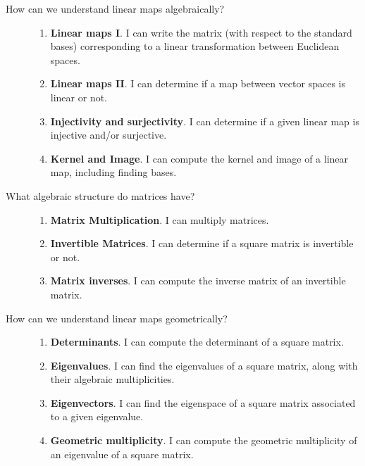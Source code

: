 \documentclass{article}
\begin{document}
\begin{description}
\item[How can we understand linear maps algebraically?] \hfill
\begin{enumerate}
\item {\bf Linear maps I}.  I can write the matrix (with respect to the standard bases) corresponding to a linear transformation between Euclidean spaces.
\item {\bf Linear maps II}. I can determine if a map between vector spaces is linear or not.
\item {\bf Injectivity and surjectivity}.  I can determine if a given linear map is injective and/or surjective.
\item {\bf Kernel and Image}. I can compute the kernel and image of a linear map, including finding bases.
\end{enumerate}


\item[What algebraic structure do matrices have?] \hfill
\begin{enumerate}
\item {\bf Matrix Multiplication}. I can multiply matrices.
\item {\bf Invertible Matrices}. I can determine if a square matrix is invertible or not.
\item {\bf Matrix inverses}.  I can compute the inverse matrix of an invertible matrix.
\end{enumerate}


\item[How can we understand linear maps geometrically?] \hfill
\begin{enumerate}
\item {\bf Determinants}. I can compute the determinant of a square matrix.
\item {\bf Eigenvalues}. I can find the eigenvalues of a square matrix, along with their algebraic multiplicities.
\item {\bf Eigenvectors}. I can find the eigenspace of a square matrix associated to a given eigenvalue.
\item {\bf Geometric multiplicity}. I can compute the geometric multiplicity of an eigenvalue of a square matrix.
\end{enumerate}

\end{description}
\end{document}
